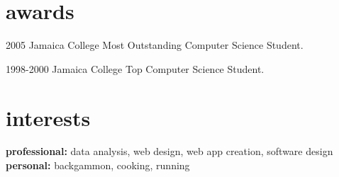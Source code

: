 \documentclass[]{friggeri-cv} %
\begin{document}
\section{awards}

\begin{entrylist}
\entry
{2005}
{Jamaica College}
{}
{Most Outstanding Computer Science Student.}

\entry
{1998-2000}
{Jamaica College}
{}
{Top Computer Science Student.}
\end{entrylist}


\section{interests}

\textbf{professional:} data analysis, web design, web app creation, software design \\ 
\textbf{personal:} backgammon, cooking, running


\end{document}
